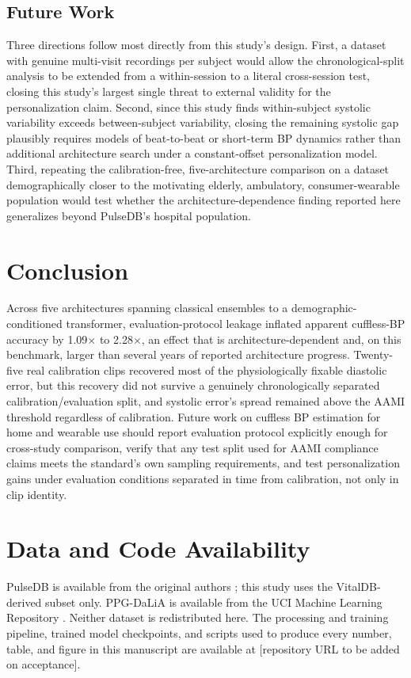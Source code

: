 \documentclass[journal]{IEEEtran}
\begin{document}
\subsection{Future Work}
Three directions follow most directly from this study's design. First, a dataset with genuine multi-visit recordings per subject would allow the chronological-split analysis to be extended from a within-session to a literal cross-session test, closing this study's largest single threat to external validity for the personalization claim. Second, since this study finds within-subject systolic variability exceeds between-subject variability, closing the remaining systolic gap plausibly requires models of beat-to-beat or short-term BP dynamics rather than additional architecture search under a constant-offset personalization model. Third, repeating the calibration-free, five-architecture comparison on a dataset demographically closer to the motivating elderly, ambulatory, consumer-wearable population would test whether the architecture-dependence finding reported here generalizes beyond PulseDB's hospital population.

\section{Conclusion}

Across five architectures spanning classical ensembles to a demographic-conditioned transformer, evaluation-protocol leakage inflated apparent cuffless-BP accuracy by 1.09$\times$ to 2.28$\times$, an effect that is architecture-dependent and, on this benchmark, larger than several years of reported architecture progress. Twenty-five real calibration clips recovered most of the physiologically fixable diastolic error, but this recovery did not survive a genuinely chronologically separated calibration/evaluation split, and systolic error's spread remained above the AAMI threshold regardless of calibration. Future work on cuffless BP estimation for home and wearable use should report evaluation protocol explicitly enough for cross-study comparison, verify that any test split used for AAMI compliance claims meets the standard's own sampling requirements, and test personalization gains under evaluation conditions separated in time from calibration, not only in clip identity.

\section*{Data and Code Availability}
PulseDB is available from the original authors \cite{wang2022}; this study uses the VitalDB-derived subset only. PPG-DaLiA is available from the UCI Machine Learning Repository \cite{reiss2019}. Neither dataset is redistributed here. The processing and training pipeline, trained model checkpoints, and scripts used to produce every number, table, and figure in this manuscript are available at [repository URL to be added on acceptance].
\end{document}
